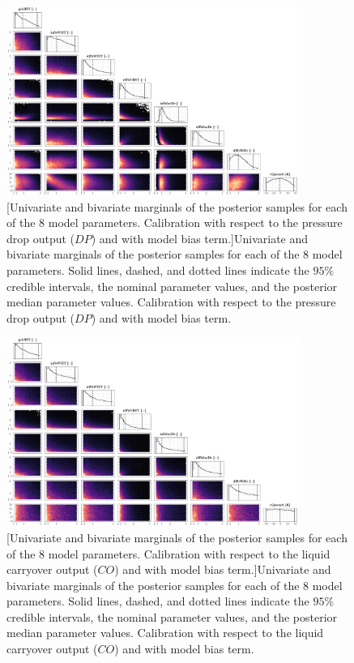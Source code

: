 \clearpage
\begin{figure}
	\centering
	\includegraphics[width=0.85\textwidth]{../figures/chapter5/figures/plotEnsDPDiscCentered}
		[Univariate and bivariate marginals of the posterior samples for each of the $8$ model parameters. Calibration with respect to the pressure drop output ($DP$) and with model bias term.]{Univariate and bivariate marginals of the posterior samples for each of the $8$ model parameters. Solid lines, dashed, and dotted lines indicate the $95\%$ credible intervals, the nominal parameter values, and the posterior median parameter values. Calibration with respect to the pressure drop output ($DP$) and with model bias term.}
	\label{fig:ch5_plot_ens_dp_disc_centered}
\end{figure}

\clearpage
\begin{figure}
	\centering
	\includegraphics[width=0.85\textwidth]{../figures/chapter5/figures/plotEnsCODiscCentered}
		[Univariate and bivariate marginals of the posterior samples for each of the $8$ model parameters. Calibration with respect to the liquid carryover output ($CO$) and with model bias term.]{Univariate and bivariate marginals of the posterior samples for each of the $8$ model parameters. Solid lines, dashed, and dotted lines indicate the $95\%$ credible intervals, the nominal parameter values, and the posterior median parameter values. Calibration with respect to the liquid carryover output ($CO$) and with model bias term.}
	\label{fig:ch5_plot_ens_co_disc_centered}
\end{figure}

